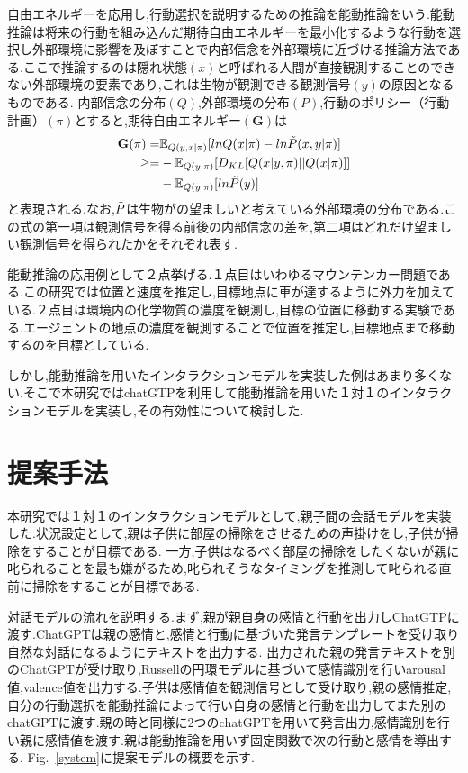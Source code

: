 \documentclass[a4j,10pt,uplatex]{jsarticle}
\begin{document}
自由エネルギーを応用し,行動選択を説明するための推論を能動推論をいう.能動推論は将来の行動を組み込んだ期待自由エネルギーを最小化するような行動を選択し外部環境に影響を及ぼすことで内部信念を外部環境に近づける推論方法である.ここで推論するのは隠れ状態$(x)$と呼ばれる人間が直接観測することのできない外部環境の要素であり,これは生物が観測できる観測信号$(y)$の原因となるものである.
内部信念の分布$(Q)$,外部環境の分布$(P)$,行動のポリシー（行動計画）$(\pi)$とすると,期待自由エネルギー$(\mathbf{G})$は
\begin{align*}
    \mathbf{G}(\pi) = &\mathbb{E}_{Q(y,x|\pi)}[lnQ(x|\pi) - ln\Tilde{P}(x,y|\pi)] \\
            \ge = &-\mathbb{E}_{Q(y|\pi)}[D_{KL}[Q(x|y,\pi)||Q(x|\pi)]] \\
            &- \mathbb{E}_{Q(y|\pi)}[ln\Tilde{P}(y)]    
\end{align*}
と表現される.なお,$\Tilde{P}$は生物がの望ましいと考えている外部環境の分布である.この式の第一項は観測信号を得る前後の内部信念の差を,第二項はどれだけ望ましい観測信号を得られたかをそれぞれ表す.

能動推論の応用例として２点挙げる.１点目はいわゆるマウンテンカー問題である\cite{mountaincar}.この研究では位置と速度を推定し,目標地点に車が達するように外力を加えている.２点目は環境内の化学物質の濃度を観測し,目標の位置に移動する実験である\cite{mcgregor2015minimal}.エージェントの地点の濃度を観測することで位置を推定し,目標地点まで移動するのを目標としている.

しかし,能動推論を用いたインタラクションモデルを実装した例はあまり多くない.そこで本研究ではchatGTPを利用して能動推論を用いた１対１のインタラクションモデルを実装し,その有効性について検討した.

\section{提案手法}
本研究では１対１のインタラクションモデルとして,親子間の会話モデルを実装した.状況設定として,親は子供に部屋の掃除をさせるための声掛けをし,子供が掃除をすることが目標である.
一方,子供はなるべく部屋の掃除をしたくないが親に叱られることを最も嫌がるため,叱られそうなタイミングを推測して叱られる直前に掃除をすることが目標である.

対話モデルの流れを説明する.まず,親が親自身の感情と行動を出力しChatGTPに渡す.ChatGPTは親の感情と,感情と行動に基づいた発言テンプレートを受け取り自然な対話になるようにテキストを出力する.
出力された親の発言テキストを別のChatGPTが受け取り,Russellの円環モデルに基づいて感情識別を行いarousal値,valence値を出力する.子供は感情値を観測信号として受け取り,親の感情推定,自分の行動選択を能動推論によって行い自身の感情と行動を出力してまた別のchatGPTに渡す.親の時と同様に2つのchatGPTを用いて発言出力,感情識別を行い親に感情値を渡す.親は能動推論を用いず固定関数で次の行動と感情を導出する.
Fig.~\ref{system}に提案モデルの概要を示す.
\end{document}
